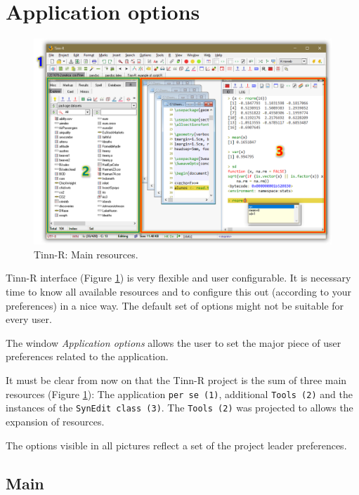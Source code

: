 
\hypertarget{working_app}{}
\section{Application options}

\begin{figure}[H]
  \begin{center}
    \includegraphics[width=\headwidth]{./res/parts_01.png}
  \end{center}
  \caption{Tinn-R: Main resources.}
  \label{fig:tinn-r_interface}
\end{figure}

Tinn-R interface
(Figure \ref{fig:tinn-r_interface})
is very flexible and user configurable. It is necessary time
to know all available resources and to configure this out (according to your
preferences) in a nice way. The default set of options might not be suitable
for every user.

The window \textit{Application options} allows the user to set the major piece
of user preferences related to the application.

It must be clear from now on that the Tinn-R project is the sum of three main
resources (Figure \ref{fig:tinn-r_interface}):
The application \texttt{per se (1)},
additional \texttt{Tools (2)} and
the instances of the \texttt{SynEdit class (3)}.
The \texttt{Tools (2)} was projected to allows the expansion of resources.

The options visible in all pictures reflect a set of the project leader preferences.


\hypertarget{working_app_main}{}
\subsection{Main}

